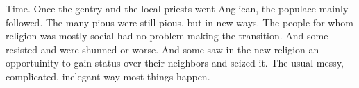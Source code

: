Time.
Once the gentry and the local priests went Anglican, the populace mainly followed.
The many pious were still pious, but in new ways.
The people for whom religion was mostly social had no problem making the transition.
And some resisted and were shunned or worse.
And some saw in the new religion an opportuinity to gain status over their neighbors and seized it.
The usual messy, complicated, inelegant way most things happen. 
